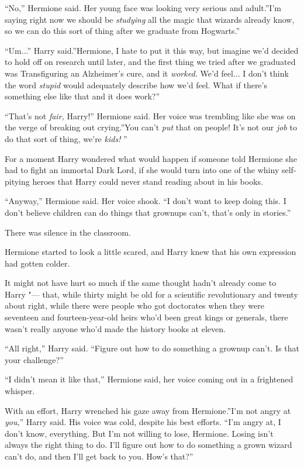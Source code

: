 ``No,'' Hermione said. Her young face was looking very serious and
adult.''I'm saying right now we should be \emph{studying} all the magic
that wizards already know, so we can do this sort of thing after we
graduate from Hogwarts.''

``Um...'' Harry said.''Hermione, I hate to put it this way, but
imagine we'd decided to hold off on research until later, and the first
thing we tried after we graduated was Transfiguring an Alzheimer's cure,
and it \emph{worked.} We'd feel... I don't think the word
\emph{stupid} would adequately describe how we'd feel. What if there's
something else like that and it does work?''

``That's not \emph{fair,} Harry!'' Hermione said. Her voice was trembling
like she was on the verge of breaking out crying.''You can't \emph{put}
that on people! It's not our \emph{job} to do that sort of thing, we're
\emph{kids!} ''

For a moment Harry wondered what would happen if someone told Hermione
she had to fight an immortal Dark Lord, if she would turn into one of
the whiny self-pitying heroes that Harry could never stand reading about
in his books.

``Anyway,'' Hermione said. Her voice shook. ``I don't want to keep doing
this. I don't believe children can do things that grownups can't, that's
only in stories.''

There was silence in the classroom.

Hermione started to look a little scared, and Harry knew that his own
expression had gotten colder.

It might not have hurt so much if the same thought hadn't already come
to Harry "--- that, while thirty might be old for a scientific
revolutionary and twenty about right, while there were people who got
doctorates when they were seventeen and fourteen-year-old heirs who'd
been great kings or generals, there wasn't really anyone who'd made the
history books at eleven.

``All right,'' Harry said. ``Figure out how to do something a grownup
can't. Is that your challenge?''

``I didn't mean it like that,'' Hermione said, her voice coming out in a
frightened whisper.

With an effort, Harry wrenched his gaze away from Hermione.''I'm not
angry at \emph{you},'' Harry said. His voice was cold, despite his best
efforts. ``I'm angry at, I don't know, everything. But I'm not willing
to lose, Hermione. Losing isn't always the right thing to do. I'll
figure out how to do something a grown wizard can't do, and then I'll
get back to you. How's that?''

